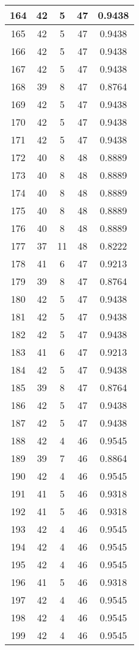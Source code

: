 \documentclass[letterpaper, 12pt]{article}
\begin{document}
\begin{longtable}{|c|c|c|c|c|}
\hline
164 & 42 & 5 & 47 & 0.9438 \\
\hline
165 & 42 & 5 & 47 & 0.9438 \\
\hline
166 & 42 & 5 & 47 & 0.9438 \\
\hline
167 & 42 & 5 & 47 & 0.9438 \\
\hline
168 & 39 & 8 & 47 & 0.8764 \\
\hline
169 & 42 & 5 & 47 & 0.9438 \\
\hline
170 & 42 & 5 & 47 & 0.9438 \\
\hline
171 & 42 & 5 & 47 & 0.9438 \\
\hline
172 & 40 & 8 & 48 & 0.8889 \\
\hline
173 & 40 & 8 & 48 & 0.8889 \\
\hline
174 & 40 & 8 & 48 & 0.8889 \\
\hline
175 & 40 & 8 & 48 & 0.8889 \\
\hline
176 & 40 & 8 & 48 & 0.8889 \\
\hline
177 & 37 & 11 & 48 & 0.8222 \\
\hline
178 & 41 & 6 & 47 & 0.9213 \\
\hline
179 & 39 & 8 & 47 & 0.8764 \\
\hline
180 & 42 & 5 & 47 & 0.9438 \\
\hline
181 & 42 & 5 & 47 & 0.9438 \\
\hline
182 & 42 & 5 & 47 & 0.9438 \\
\hline
183 & 41 & 6 & 47 & 0.9213 \\
\hline
184 & 42 & 5 & 47 & 0.9438 \\
\hline
185 & 39 & 8 & 47 & 0.8764 \\
\hline
186 & 42 & 5 & 47 & 0.9438 \\
\hline
187 & 42 & 5 & 47 & 0.9438 \\
\hline
188 & 42 & 4 & 46 & 0.9545 \\
\hline
189 & 39 & 7 & 46 & 0.8864 \\
\hline
190 & 42 & 4 & 46 & 0.9545 \\
\hline
191 & 41 & 5 & 46 & 0.9318 \\
\hline
192 & 41 & 5 & 46 & 0.9318 \\
\hline
193 & 42 & 4 & 46 & 0.9545 \\
\hline
194 & 42 & 4 & 46 & 0.9545 \\
\hline
195 & 42 & 4 & 46 & 0.9545 \\
\hline
196 & 41 & 5 & 46 & 0.9318 \\
\hline
197 & 42 & 4 & 46 & 0.9545 \\
\hline
198 & 42 & 4 & 46 & 0.9545 \\
\hline
199 & 42 & 4 & 46 & 0.9545 \\
\hline
\end{longtable}
\end{document}
